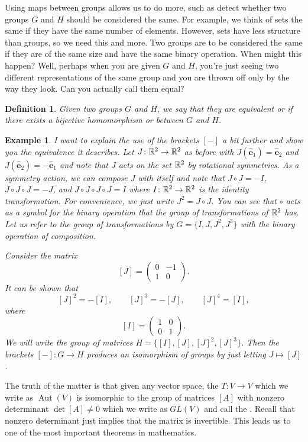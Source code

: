 \documentclass{article}
\theoremstyle{indented}
\newtheorem{definition}{Definition}
\newtheorem{example}{Example}
\newcommand{\evec}{\boldsymbol{\hat{e}}}
\newcommand{\aut}{\operatorname{Aut}}
\begin{document}
Using maps between groups allows us to do more, such as detect whether two groups $G$ and $H$ should be considered the same. For example, we think of sets the same if they have the same number of elements. However, sets have less structure than groups, so we need this and more. Two groups are to be considered the same if they are of the same size and have the same binary operation. When might this happen? Well, perhaps when you are given $G$ and $H$, you're just seeing two different representations of the same group and you are thrown off only by the way they look. Can you actually call them equal?

\begin{definition}
Given two groups $G$ and $H$, we say that they are equivalent or  if there exists a bijective homomorphism or  between $G$ and $H$.
\end{definition}

\begin{example}
I want to explain the use of the brackets $[-]$ a bit further and show you the equivalence it describes. Let $J\colon \mathbb{R}^2 \to \mathbb{R}^2$ as before with $J(\evec_1)=\evec_2$ and $J(\evec_2)=-\evec_1$ and note that $J$ acts on the set $\mathbb{R}^2$ by rotational symmetries. As a symmetry action, we can compose $J$ with itself and note that $J\circ J=-I$, $J\circ J \circ J=-J$, and $J\circ J \circ J \circ J=I$ where $I\colon \mathbb{R}^2 \to \mathbb{R}^2$ is the identity transformation. For convenience, we just write $J^2=J\circ J$. You can see that $\circ$ acts as a symbol for the binary operation that the group of transformations of $\mathbb{R}^2$ has. Let us refer to the group of transformations by $G=\{I,J,J^2,J^3\}$ with the binary operation of composition.

Consider the matrix
\[
[J] = \begin{pmatrix} 0 & -1 \\ 1 & 0 \end{pmatrix}.
\]
It can be shown that
\[
[J]^2 = -[I], \qquad [J]^3 = -[J], \qquad [J]^4 = [I],
\]
where
\[
[I]=\begin{pmatrix} 1 & 0 \\ 0  & 1 \end{pmatrix}.
\]
We will write the group of matrices $H=\{[I],[J],[J]^2,[J]^3\}$. Then the brackets $[-]\colon G \to H$ produces an isomorphism of groups by just letting $J\mapsto [J]$.
\end{example}

The truth of the matter is that given any vector space, the  $T\colon V \to V$ which we write as $\aut(V)$ is isomorphic to the group of matrices $[A]$ with nonzero determinant $\det[A]\neq 0$ which we write as $GL(V)$ and call the . Recall that nonzero determinant just implies that the matrix is invertible. This leads us to one of the most important theorems in mathematics.
\end{document}

